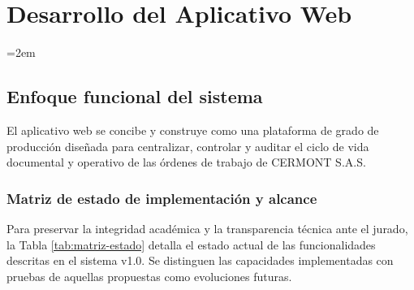 
\chapter{Desarrollo del Aplicativo Web}
\label{ch:desarrollo}

\setlength{\parindent}{0pt}
\setlength{\parskip}{6pt}
\sloppy
\emergencystretch=2em
\raggedbottom
\section{Enfoque funcional del sistema}

El aplicativo web se concibe y construye como una plataforma de grado de producción diseñada para centralizar, controlar y auditar el ciclo de vida documental y operativo de las órdenes de trabajo de CERMONT S.A.S. 

\subsection{Matriz de estado de implementación y alcance}

Para preservar la integridad académica y la transparencia técnica ante el jurado, la Tabla \ref{tab:matriz-estado} detalla el estado actual de las funcionalidades descritas en el sistema v1.0. Se distinguen las capacidades implementadas con pruebas de aquellas propuestas como evoluciones futuras.

